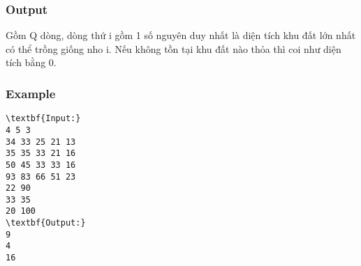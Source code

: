 \subsubsection{Output}

Gồm Q dòng, dòng thứ i gồm 1 số nguyên duy nhất là diện tích khu đất lớn nhất có thể trồng giống nho i. Nếu không tồn tại khu đất nào thỏa thì coi như diện tích bằng 0.

\subsubsection{Example}
\begin{verbatim}
\textbf{Input:}
4 5 3
34 33 25 21 13
35 35 33 21 16
50 45 33 33 16
93 83 66 51 23
22 90
33 35
20 100
\textbf{Output:}
9
4
16\end{verbatim}
